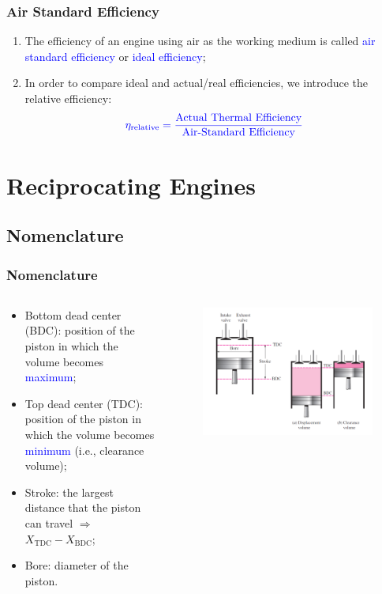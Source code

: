 \documentclass[10pt,compress]{beamer}
\begin{document}
\begin{frame}
 \frametitle{Air Standard Efficiency}
  \begin{enumerate}
   \item The efficiency of an engine using air as the working medium is called \textcolor{blue}{air standard efficiency} or \textcolor{blue}{ideal efficiency};
   \item In order to compare ideal and actual/real efficiencies, we introduce the relative efficiency:
    \begin{displaymath}
      \textcolor{blue}{\eta_{\text{relative}}=\displaystyle\frac{\text{Actual Thermal Efficiency}}{\text{Air-Standard Efficiency}}}
    \end{displaymath}
  \end{enumerate}
\end{frame}

\section{Reciprocating Engines}
\subsection{Nomenclature}
\begin{frame}
 \frametitle{Nomenclature}
 \begin{columns}
  \begin{column}[c]{0.5\linewidth}
   \begin{itemize}\scriptsize
    \item <1-> Bottom dead center (BDC): position of the piston in which the volume becomes \textcolor{blue}{maximum};
    \item <2-> Top dead center (TDC): position of the piston in which the volume becomes \textcolor{blue}{minimum} (i.e., clearance volume);
    \item <3-> Stroke: the largest distance that the piston can travel $\Longrightarrow$ $X_{\text{TDC}}-X_{\text{BDC}}$;
    \item <4-> Bore: diameter of the piston.
   \end{itemize}
  \end{column}
  \begin{column}[c]{0.5\linewidth}
   \begin{figure}%
    \begin{center}
     \includegraphics[width=6.cm,clip]{./Pics/GasCycle_ReciprocatingEngine}
    \end{center}
   \end{figure}  
  \end{column}  
 \end{columns}
\end{frame}
\end{document}
